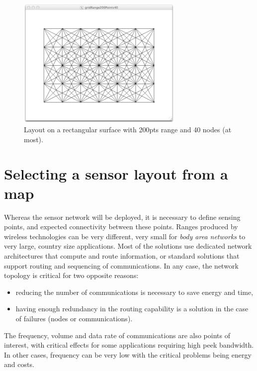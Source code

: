 \documentclass[times]{book}
\begin{document}
\begin{figure}[hbtp]
\begin{center} 
\includegraphics[width=8cm]{GridRange200Points40.png}
\caption{Layout on a rectangular surface with 200pts range and 40 nodes (at most).}
\label{fig:GridRange200Points40}
\end{center}
\end{figure}


\section{Selecting a sensor layout from a map}

Whereas the sensor network will be deployed, it is necessary to define sensing points,
and expected connectivity between these points. Ranges produced by wireless technologies
can be very different, very small for {\sl body area networks} to very large, country size applications.
Most of the solutions use dedicated network architectures that compute and route information, 
or standard solutions that support routing and sequencing of communications.
In any case, the network topology is critical for two opposite reasons:

\begin{itemize}
\item reducing the number of communications is necessary to save energy and time,

\item having enough redundancy in the routing capability is a solution in the case
of failures (nodes or communications).
\end{itemize}

The frequency, volume and data rate of communications are also   points of interest, with
critical effects for  
some applications requiring high peek bandwidth. In other cases, frequency
can be very low  
with the critical problems being  energy and costs.
\end{document}
